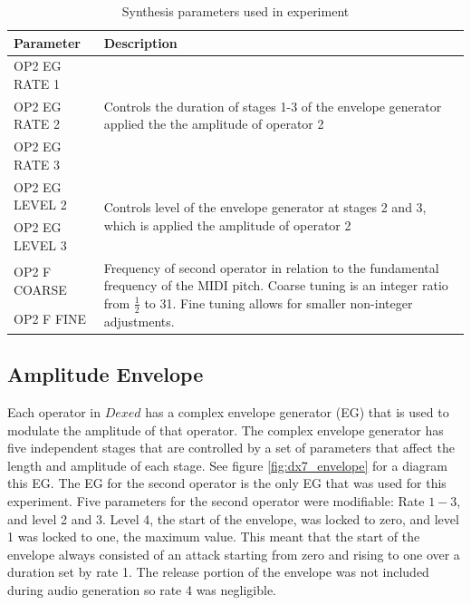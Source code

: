\begin{table}[ht]
\centering
\caption{Synthesis parameters used in experiment}
\label{tbl:dexed-params}
\begin{tabular}{l|l}
\toprule
Parameter     & Description                                                                                  \\
\midrule
OP2 EG RATE 1 & \multirow{3}{*}{\parbox{0.70\linewidth}{Controls the duration of stages 1-3 of the envelope generator applied the the amplitude of operator 2}} \\
OP2 EG RATE 2 \\
OP2 EG RATE 3 \\
\midrule
OP2 EG LEVEL 2 & \multirow{2}{*}{\parbox{0.6\linewidth}{Controls level of the envelope generator at stages 2 and 3, which is applied the amplitude of operator 2}} \\
OP2 EG LEVEL 3 \\
\midrule
OP2 F COARSE & \multirow{2}{*}{\parbox{0.6\linewidth}{Frequency of second operator in relation to the fundamental frequency of the MIDI pitch. Coarse tuning is an integer ratio from $\frac{1}{2}$ to 31. Fine tuning allows for smaller non-integer adjustments.}} \\[2.75ex]
OP2 F FINE \\[2.75ex]
\bottomrule                                                                                        
\end{tabular}
\end{table}
\vspace{1cm}

\subsection{Amplitude Envelope}
Each operator in $Dexed$ has a complex envelope generator (EG) that is used to modulate the amplitude of that operator. The complex envelope generator has five independent stages that are controlled by a set of parameters that affect the length and amplitude of each stage. See figure \ref{fig:dx7_envelope} for a diagram this EG. The EG for the second operator is the only EG that was used for this experiment. Five parameters for the second operator were modifiable: Rate $1-3$, and level 2 and 3. Level 4, the start of the envelope, was locked to zero, and level 1 was locked to one, the maximum value. This meant that the start of the envelope always consisted of an attack starting from zero and rising to one over a duration set by rate 1. The release portion of the envelope was not included during audio generation so rate 4 was negligible.

